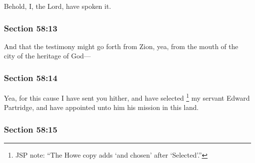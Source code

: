		Behold, I, the Lord, have spoken it.


	\subsubsection{Section 58:13} %
		\label{DC58-13}

		And that the testimony might go forth from Zion, yea, from the mouth of the city of the heritage of God---


	\subsubsection{Section 58:14} %
		\label{DC58-14}

		Yea, for this cause I have sent you hither, and have selected%
			\footnote{%
				JSP note: ``The Howe copy adds `and chosen' after `Selected'.''
				}
		my servant Edward Partridge, and have appointed unto him his mission in this land.


	\subsubsection{Section 58:15} %
		\label{DC58-15}

